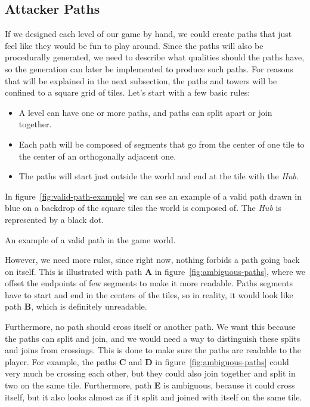\subsection{Attacker Paths}

If we designed each level of our game by hand, we could create paths that just feel like they would be fun to play around.
Since the paths will also be procedurally generated, we need to describe what qualities should the paths have, so the generation can later be implemented to produce such paths.
For reasons that will be explained in the next subsection, the paths and towers will be confined to a square grid of tiles.
Let's start with a few basic rules:
\begin{itemize}
    \item A level can have one or more paths, and paths can split apart or join together.
    \item Each path will be composed of segments that go from the center of one tile to the center of an orthogonally adjacent one.
    \item The paths will start just outside the world and end at the tile with the \emph{Hub}.
\end{itemize}
In figure~\ref{fig:valid-path-example} we can see an example of a valid path drawn in blue on a backdrop of the square tiles the world is composed of.
The \emph{Hub} is represented by a black dot.

\begin{center}
    \captionsetup{type=figure}
    \caption{An example of a valid path in the game world.}
    \label{fig:valid-path-example}
\end{center}

However, we need more rules, since right now, nothing forbids a path going back on itself.
This is illustrated with path \textbf{A} in figure~\ref{fig:ambiguous-paths}, where we offset the endpoints of few segments to make it more readable.
Paths segments have to start and end in the centers of the tiles, so in reality, it would look like path \textbf{B}, which is definitely unreadable.

Furthermore, no path should cross itself or another path.
We want this because the paths can split and join, and we would need a way to distinguish these splits and joins from crossings.
This is done to make sure the paths are readable to the player.
For example, the paths \textbf{C} and \textbf{D} in figure~\ref{fig:ambiguous-paths} could very much be crossing each other, but they could also join together and split in two on the same tile.
Furthermore, path \textbf{E} is ambiguous, because it could cross itself, but it also looks almost as if it split and joined with itself on the same tile.

